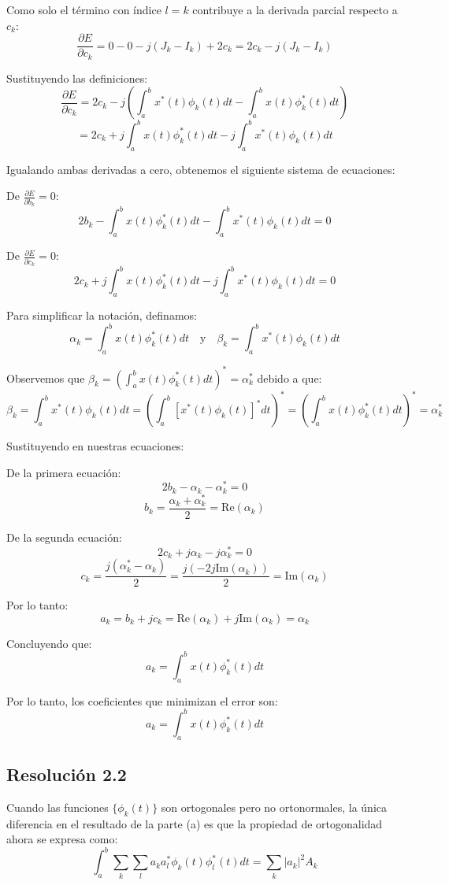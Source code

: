 \documentclass[
  11pt,
  letterpaper,
   addpoints,
   answers
  ]{exam}
\begin{document}
\begin{questions}
\begin{solution}
Como solo el término con índice $l = k$ contribuye a la derivada parcial respecto a $c_k$:
$$\frac{\partial E}{\partial c_k} = 0 - 0 - j(J_k - I_k) + 2c_k = 2c_k - j(J_k - I_k)$$

Sustituyendo las definiciones:
$$\boxed{\frac{\partial E}{\partial c_k} = 2c_k - j\left(\int_a^b x^*(t)\phi_k(t) dt - \int_a^b x(t)\phi_k^*(t) dt\right)}$$
$$= 2c_k + j\int_a^b x(t)\phi_k^*(t) dt - j\int_a^b x^*(t)\phi_k(t) dt$$

Igualando ambas derivadas a cero, obtenemos el siguiente sistema de ecuaciones:

De $\frac{\partial E}{\partial b_k} = 0$:
$$2b_k - \int_a^b x(t)\phi_k^*(t) dt - \int_a^b x^*(t)\phi_k(t) dt = 0$$

De $\frac{\partial E}{\partial c_k} = 0$:
$$2c_k + j\int_a^b x(t)\phi_k^*(t) dt - j\int_a^b x^*(t)\phi_k(t) dt = 0$$

Para simplificar la notación, definamos:
$$\alpha_k = \int_a^b x(t)\phi_k^*(t) dt \quad \text{y} \quad \beta_k = \int_a^b x^*(t)\phi_k(t) dt$$

Observemos que $\beta_k = \left(\int_a^b x(t)\phi_k^*(t) dt\right)^* = \alpha_k^*$ debido a que:
$$\beta_k = \int_a^b x^*(t)\phi_k(t) dt = \left(\int_a^b [x^*(t)\phi_k(t)]^* dt\right)^* = \left(\int_a^b x(t)\phi_k^*(t) dt\right)^* = \alpha_k^*$$

Sustituyendo en nuestras ecuaciones:

De la primera ecuación:
$$2b_k - \alpha_k - \alpha_k^* = 0$$
$$b_k = \frac{\alpha_k + \alpha_k^*}{2} = \text{Re}(\alpha_k)$$

De la segunda ecuación:
$$2c_k + j\alpha_k - j\alpha_k^* = 0$$
$$c_k = \frac{j(\alpha_k^* - \alpha_k)}{2} = \frac{j(-2j\text{Im}(\alpha_k))}{2} = \text{Im}(\alpha_k)$$

Por lo tanto:
$$a_k = b_k + jc_k = \text{Re}(\alpha_k) + j\text{Im}(\alpha_k) = \alpha_k$$

Concluyendo que:
$$a_k = \int_a^b x(t)\phi_k^*(t) dt$$

Por lo tanto, los coeficientes que minimizan el error son:
$$\boxed{a_k = \int_a^b x(t)\phi_k^*(t) dt}$$

\subsection*{Resolución 2.2}
Cuando las funciones $\{\phi_k(t)\}$ son ortogonales pero no ortonormales, la única diferencia en el resultado de la parte (a) es que la propiedad de ortogonalidad ahora se expresa como:
$$\int_a^b \sum_k \sum_l a_k a_l^*\phi_k(t)\phi_l^*(t) dt = \sum_k |a_k|^2 A_k$$


\end{solution}
\end{questions}
\end{document}
